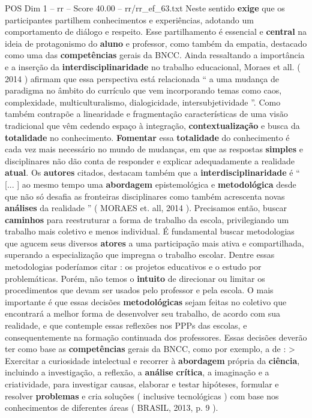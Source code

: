 \begin{textsample}{POS Dim 1 – rr – Score 40.00 – rr/rr\_ef\_63.txt}
Neste sentido \textbf{exige} que os participantes partilhem conhecimentos e experiências, adotando um comportamento de diálogo e respeito.
Esse partilhamento é essencial e \textbf{central} na ideia de protagonismo do \textbf{aluno} e professor, como também da empatia, destacado como uma das \textbf{competências} gerais da BNCC.
Ainda ressaltando a importância e a inserção da \textbf{interdisciplinaridade} no trabalho educacional, Moraes et all. ( 2014 ) afirmam que essa perspectiva está relacionada “ a uma mudança de paradigma no âmbito do currículo que vem incorporando temas como caos, complexidade, multiculturalismo, dialogicidade, intersubjetividade ”.
Como também contrapõe a linearidade e fragmentação características de uma visão tradicional que vêm cedendo espaço à integração, \textbf{contextualização} e busca da \textbf{totalidade} no conhecimento. \textbf{Fomentar} essa \textbf{totalidade} do conhecimento é cada vez mais necessário no mundo de mudanças, em que as respostas \textbf{simples} e disciplinares não dão conta de responder e explicar adequadamente a realidade \textbf{atual}.
Os \textbf{autores} citados, destacam também que a \textbf{interdisciplinaridade} é “ [... ] ao mesmo tempo uma \textbf{abordagem} epistemológica e \textbf{metodológica} desde que não só desafia as fronteiras disciplinares como também acrescenta novas \textbf{análises} da realidade ” ( MORAES et. all, 2014 ).
Precisamos então, buscar \textbf{caminhos} para reestruturar a forma de trabalho da escola, privilegiando um trabalho mais coletivo e menos individual.
É fundamental buscar metodologias que agucem seus diversos \textbf{atores} a uma participação mais ativa e compartilhada, superando a especialização que impregna o trabalho escolar.
Dentre essas metodologias poderíamos citar : os projetos educativos e o estudo por problemáticas.
Porém, não temos o \textbf{intuito} de direcionar ou limitar os procedimentos que devam ser usados pelo professor e pela escola.
O mais importante é que essas decisões \textbf{metodológicas} sejam feitas no coletivo que encontrará a melhor forma de desenvolver seu trabalho, de acordo com sua realidade, e que contemple essas reflexões nos PPPs das escolas, e consequentemente na formação continuada dos professores.
Essas decisões deverão ter como base as \textbf{competências} gerais da BNCC, como por exemplo, a de : > Exercitar a curiosidade intelectual e recorrer à \textbf{abordagem} própria da \textbf{ciência}, incluindo a investigação, a reflexão, a \textbf{análise} \textbf{crítica}, a imaginação e a criatividade, para investigar causas, elaborar e testar hipóteses, formular e resolver \textbf{problemas} e cria soluções ( inclusive tecnológicas ) com base nos conhecimentos de diferentes áreas ( BRASIL, 2013, p. 9 ).

\end{textsample}
